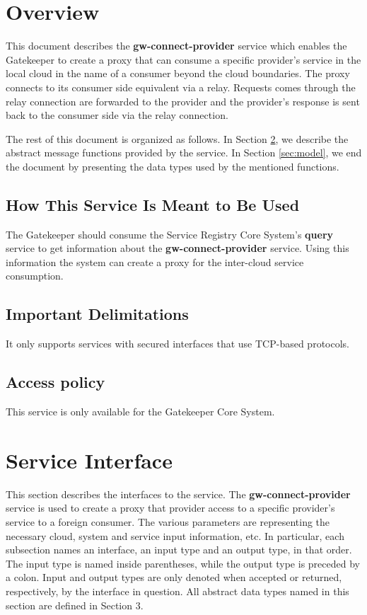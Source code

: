 \documentclass[a4paper]{arrowhead}
\begin{document}
\section{Overview}
\label{sec:overview}
This document describes the \textbf{gw-connect-provider} service which enables the Gatekeeper to create a proxy that can consume a specific provider's service in the local cloud in the name of a consumer beyond the cloud boundaries. The proxy connects to its consumer side equivalent via a relay. Requests comes through the relay connection are forwarded to the provider and the provider's response is sent back to the consumer side via the relay connection.

The rest of this document is organized as follows.
In Section \ref{sec:functions}, we describe the abstract message functions provided by the service.
In Section \ref{sec:model}, we end the document by presenting the data types used by the mentioned functions.

\subsection{How This Service Is Meant to Be Used}
The Gatekeeper should consume the Service Registry Core System’s \textbf{query} service to get information about the \textbf{gw-connect-provider} service. Using this information the system can create a proxy for the inter-cloud service consumption.

\subsection{Important Delimitations}
\label{sec:delimitations}

It only supports services with secured interfaces that use TCP-based protocols.

\subsection{Access policy}
\label{sec:accesspolicy}

This service is only available for the Gatekeeper Core System.

\newpage

\section{Service Interface}
\label{sec:functions}

This section describes the interfaces to the service. The \textbf{gw-connect-provider} service is used to create a proxy that provider access to a specific provider's service to a foreign consumer. The various parameters are representing the necessary cloud, system and service input information, etc.
In particular, each subsection names an interface, an input type and an output type, in that order.
The input type is named inside parentheses, while the output type is preceded by a colon.
Input and output types are only denoted when accepted or returned, respectively, by the interface in question. All abstract data types named in this section are defined in Section 3.
\end{document}
